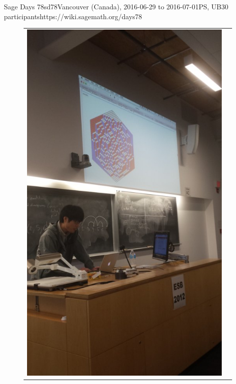 \begin{event}{Sage Days 78}{sd78}{Vancouver (Canada), 2016-06-29 to 2016-07-01}{PS, UB}{30 participants}{https://wiki.sagemath.org/days78}
\begin{figure}[ht]
\begin{tabular}{cc}
\includegraphics[scale=0.3]{pictures/sd78-2.jpg}
\end{tabular}
\end{figure}



\end{event}